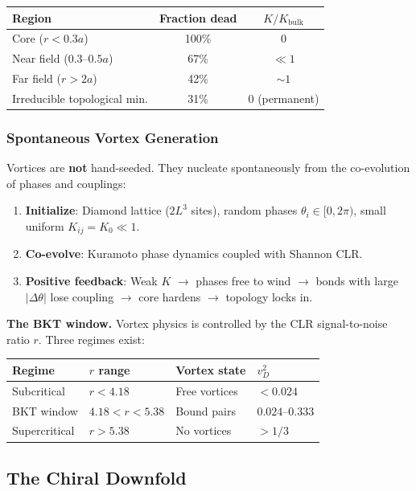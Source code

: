 \documentclass[aps,prd,onecolumn,superscriptaddress,floatfix,12pt]{revtex4-2}
\newcommand{\Kbulk}{K_{\text{bulk}}}
\begin{document}
\begin{table}[h]
\begin{tabular}{lcc}
\toprule
Region & Fraction dead & $K/\Kbulk$ \\
\midrule
Core ($r < 0.3a$) & 100\% & 0 \\
Near field ($0.3$--$0.5a$) & 67\% & $\ll 1$ \\
Far field ($r > 2a$) & 42\% & $\sim 1$ \\
Irreducible topological min. & 31\% & 0 (permanent) \\
\bottomrule
\end{tabular}
\end{table}

\subsubsection{Spontaneous Vortex Generation}

Vortices are \textbf{not} hand-seeded. They nucleate spontaneously from the co-evolution of phases and couplings:
\begin{enumerate}
\item \textbf{Initialize}: Diamond lattice ($2L^3$ sites), random phases $\theta_i \in [0, 2\pi)$, small uniform $K_{ij} = K_0 \ll 1$.
\item \textbf{Co-evolve}: Kuramoto phase dynamics coupled with Shannon CLR.
\item \textbf{Positive feedback}: Weak $K$ $\to$ phases free to wind $\to$ bonds with large $|\Delta\theta|$ lose coupling $\to$ core hardens $\to$ topology locks in.
\end{enumerate}

\textbf{The BKT window.} Vortex physics is controlled by the CLR signal-to-noise ratio $r$. Three regimes exist:

\begin{table}[h]
\begin{tabular}{llll}
\toprule
Regime & $r$ range & Vortex state & $v_D^2$ \\
\midrule
Subcritical & $r < 4.18$ & Free vortices & $< 0.024$ \\
BKT window & $4.18 < r < 5.38$ & Bound pairs & $0.024$--$0.333$ \\
Supercritical & $r > 5.38$ & No vortices & $> 1/3$ \\
\bottomrule
\end{tabular}
\end{table}

\subsection{The Chiral Downfold}\label{sec:4-2}
\end{document}

